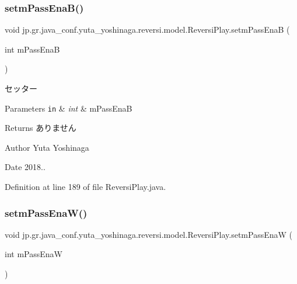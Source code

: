 \subsubsection{\texorpdfstring{setm\+Pass\+Ena\+B()}{setmPassEnaB()}}
{\footnotesize\ttfamily void jp.\+gr.\+java\+\_\+conf.\+yuta\+\_\+yoshinaga.\+reversi.\+model.\+Reversi\+Play.\+setm\+Pass\+EnaB (\begin{DoxyParamCaption}\item[{int}]{m\+Pass\+EnaB }\end{DoxyParamCaption})}



セッター 


\begin{DoxyParams}[1]{Parameters}
\mbox{\tt in}  & {\em int} & m\+Pass\+EnaB \\
\hline
\end{DoxyParams}
\begin{DoxyReturn}{Returns}
ありません 
\end{DoxyReturn}
\begin{DoxyAuthor}{Author}
Yuta Yoshinaga 
\end{DoxyAuthor}
\begin{DoxyDate}{Date}
2018.. 
\end{DoxyDate}


Definition at line 189 of file Reversi\+Play.\+java.

\mbox{\label{classjp_1_1gr_1_1java__conf_1_1yuta__yoshinaga_1_1reversi_1_1model_1_1_reversi_play_abfd46a42f82bd4fd73751d7679427e5e}} 
\subsubsection{\texorpdfstring{setm\+Pass\+Ena\+W()}{setmPassEnaW()}}
{\footnotesize\ttfamily void jp.\+gr.\+java\+\_\+conf.\+yuta\+\_\+yoshinaga.\+reversi.\+model.\+Reversi\+Play.\+setm\+Pass\+EnaW (\begin{DoxyParamCaption}\item[{int}]{m\+Pass\+EnaW }\end{DoxyParamCaption})}




